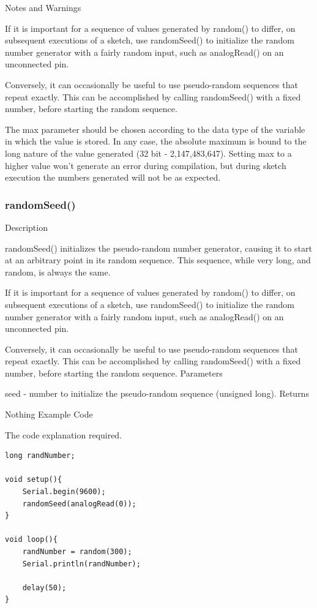\documentclass[12pt,a4paper]{report}  %
\begin{document}
Notes and Warnings

If it is important for a sequence of values generated by random() to differ, on subsequent executions of a sketch, use randomSeed() to initialize the random number generator with a fairly random input, such as analogRead() on an unconnected pin.

Conversely, it can occasionally be useful to use pseudo-random sequences that repeat exactly. This can be accomplished by calling randomSeed() with a fixed number, before starting the random sequence.

The max parameter should be chosen according to the data type of the variable in which the value is stored. In any case, the absolute maximum is bound to the long nature of the value generated (32 bit - 2,147,483,647). Setting max to a higher value won’t generate an error during compilation, but during sketch execution the numbers generated will not be as expected.

\subsubsection{randomSeed()}\label{randomSeed}


Description

randomSeed() initializes the pseudo-random number generator, causing it to start at an arbitrary point in its random sequence. This sequence, while very long, and random, is always the same.

If it is important for a sequence of values generated by random() to differ, on subsequent executions of a sketch, use randomSeed() to initialize the random number generator with a fairly random input, such as analogRead() on an unconnected pin.

Conversely, it can occasionally be useful to use pseudo-random sequences that repeat exactly. This can be accomplished by calling randomSeed() with a fixed number, before starting the random sequence.
Parameters

seed - number to initialize the pseudo-random sequence (unsigned long).
Returns

Nothing
Example Code

The code explanation required.

\begin{lstlisting}[label=digitalwrite,caption='']
long randNumber;

void setup(){
	Serial.begin(9600);
	randomSeed(analogRead(0));
}

void loop(){
	randNumber = random(300);
	Serial.println(randNumber);

	delay(50);
}
\end{lstlisting}
\end{document}
